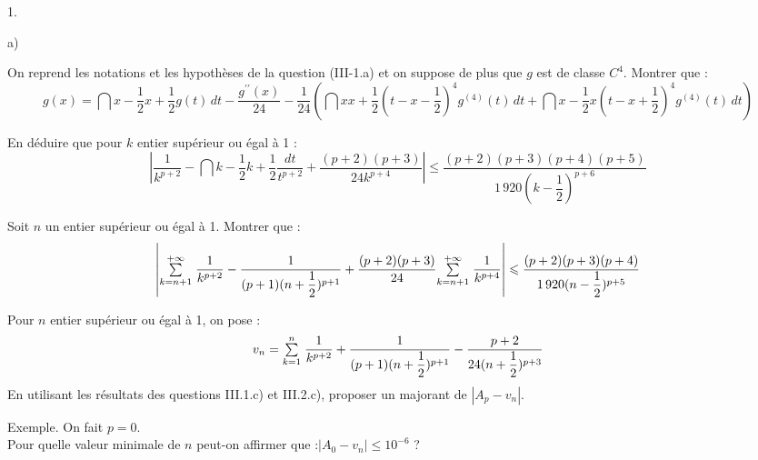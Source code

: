 \documentclass[11pt]{article}%
\begin{document}
\begin{noliste}{1.}
\begin{noliste}{a)}
 \setlength{\itemsep}{2mm}
\item On reprend les notations et les hypothèses de la question
(III-1.a) et
on suppose de plus que $g$ est de classe $C^{4}$. Montrer que :
\[
g(x) = \dint{x-{\frac{1}{2}}}{x +
{\frac{1}{2}}}g(t)\,dt-{\dfrac{g^{\prime \prime
}(x)}{24}}-{\dfrac{1}{24}}\left( \dint{x}{x +
{\frac{1}{2}}}(t-x-{\dfrac{1}{2}})^{4}g^{(4)}(t)\,dt +
\dint{x-{\frac{1}{2}}}{x}(t-x +
{\dfrac{1}{2}})^{4}g^{(4)}(t)\,dt\right)
\]

\item En déduire que pour $k$ entier supérieur ou égal à 1 : 
\[
\left| {\dfrac{1}{k^{p + 2}}}-\dint{k-{\frac{1}{2}}}{k +
{\frac{1}{2}}}{\dfrac{dt}{t^{p + 2}}} + {\dfrac{(p + 2)(p + 3)}{24k^{p
+ 4}}}\right| \leq 
{\dfrac{(p + 2)(p + 3)(p + 4)(p + 5)}{1\,920(k-{\dfrac{1}{2}})^{p +
6}}}
\]

\item Soit $n$ un entier supérieur ou égal à 1. Montrer que :
\[
\left| {\textstyle\sum\limits_{k = n + 1}^{+ \infty }}\hspace{.1cm}{\dfrac{1}{k^{p + 2}}}-{\dfrac{1}{(p +
1)(n + {\dfrac{1}{2}})^{p + 1}}} + {\dfrac{(p + 2)(p + 3)}{24}}{\textstyle\sum\limits_{k =
n + 1}^{+ \infty }}\hspace{.1cm}{\dfrac{1}{k^{p + 4}}}\right| \leqslant {\dfrac{(p + 2)(p +
3)(p + 4)}{1\,920(n-{\dfrac{1}{2}})^{p + 5}}}
\]

\item Pour $n$ entier supérieur ou égal à 1, on pose :
\[
v_{n} = {\textstyle\sum\limits_{k = 1}^{n}}\hspace{.1cm}{\dfrac{1}{k^{p + 2}}} + {\dfrac{1}{(p + 1)(n +
{\dfrac{1}{2}})^{p + 1}}}-{\dfrac{p + 2}{24(n + {\dfrac{1}{2}})^{p +
3}}}
\]
En utilisant les résultats des questions III.1.c) et III.2.c), proposer
un
majorant de $\left| A_{p}-v_{n}\right| $.

\item Exemple. On fait $p = 0$.\\
Pour quelle valeur minimale de $n$ peut-on affirmer que :\quad $\left|
A_{0}-v_{n}\right| \leq 10^{-6}$ ?
\end{noliste}
\end{noliste}

\label{fin}
\end{document}
